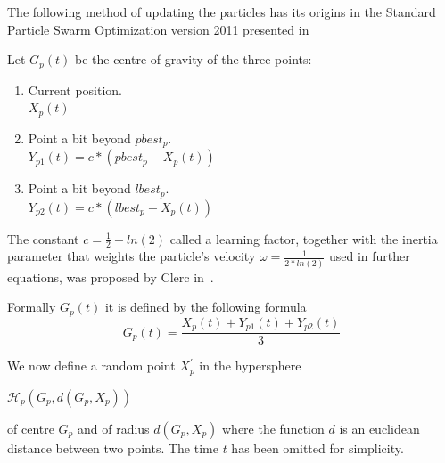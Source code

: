 \documentclass{mini}
\begin{document}

%



The following method of updating the particles has its origins in the Standard Particle Swarm Optimization version 2011 presented in~\cite{pso_11}

Let $G_p(t)$ be the centre of gravity of the three points:
\begin{enumerate}
    \item Current position. \\
    $X_p(t)$
    
    \item Point a bit beyond $pbest_p$. \\
    $Y_{p1}(t) = c*(pbest_p-X_p(t))$
    
    \item Point a bit beyond $lbest_p$. \\
    $Y_{p2}(t) = c*(lbest_p-X_p(t))$
    
\end{enumerate}

The constant $c = \frac{1}{2} + ln(2)$ called a learning factor, together with the inertia parameter that weights the particle's velocity $\omega = \frac{1}{2 * ln(2)}$ used in further equations, was proposed by Clerc in~\cite{pso_anal}.

Formally $G_p(t)$ it is defined by the following formula 
\begin{equation}
    G_p(t) = \frac{X_p(t) + Y_{p1}(t) + Y_{p2}(t)} {3}
\end{equation}

We now define a random point $X^{'}_p$ in the hypersphere
\begin{center}
    $\mathcal{H}_p(G_p, d(G_p, X_p))$ 
\end{center}
of centre $G_p$ and of radius $d(G_p, X_p)$ where the function $d$ is an euclidean distance between two points. The time $t$ has been omitted for simplicity.
\end{document}
